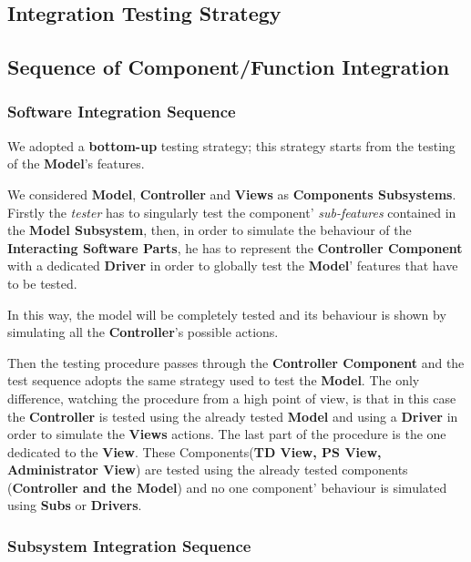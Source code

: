 \subsection{Integration Testing Strategy}

\subsection{Sequence of Component/Function Integration}

\subsubsection{Software Integration Sequence}
We adopted a \textbf{bottom-up} testing strategy; this strategy starts from the testing of the \textbf{Model}'s features.\par
We considered \textbf{Model}, \textbf{Controller} and \textbf{Views} as \textbf{Components Subsystems}.
Firstly the \textit{tester} has to singularly test the component' \textit{sub-features} contained in the \textbf{Model Subsystem}, then, in order to simulate the behaviour of the \textbf{Interacting Software Parts}, he has to represent the \textbf{Controller Component} with a dedicated \textbf{Driver} in order to globally test the \textbf{Model}' features that have to be tested.\par In this way, the model will be completely tested and its behaviour is shown by simulating all the \textbf{Controller}'s possible actions.\par
Then the testing procedure passes through the \textbf{Controller Component} and the test sequence adopts the same strategy used to test the \textbf{Model}. The only difference, watching the procedure from a high point of view, is that in this case the \textbf{Controller} is tested using the already tested \textbf{Model} and using a \textbf{Driver} in order to simulate the \textbf{Views} actions.
The last part of the procedure is the one dedicated to the \textbf{View}. These Components(\textbf{TD View, PS View, Administrator View}) are tested using the already tested components (\textbf{Controller and the Model}) and no one component' behaviour is simulated using \textbf{Subs} or \textbf{Drivers}.
\subsubsection{Subsystem Integration Sequence}
